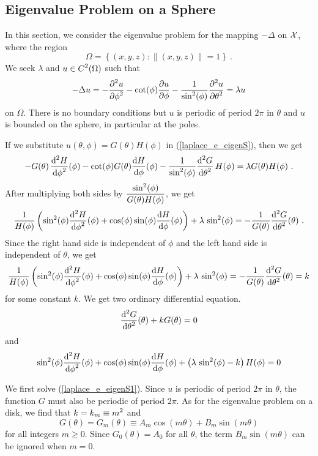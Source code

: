 \subsection{Eigenvalue Problem on a Sphere}

In this section, we consider the eigenvalue problem for the mapping
$-\Delta$ on $\cal X$, where the region
\[
  \Omega = \left\{ (x,y,z) :  \|(x,y,z)\| = 1 \right\} \ .
\]
We seek $\lambda$ and $\displaystyle u \in C^2(\Omega)$ such that
\begin{equation} \label{laplace_e_eigenS}
-\Delta u = -\frac{\displaystyle \partial^{2}{u}} {\displaystyle \partial \phi^{2}} - \cot(\phi)\frac{\partial{u}}{\partial \phi}
- \frac{1}{\sin^2(\phi)}\frac{\displaystyle \partial^{2}{u}} {\displaystyle \partial \theta^{2}} 
= \lambda u
\end{equation}
on $\Omega$.  There is no boundary conditions but $u$ is periodic of period
$2\pi$ in $\theta$ and $u$ is bounded on the sphere, in particular at
the poles.

If we substitute $u(\theta, \phi) = G(\theta)H(\phi)$ in
(\ref{laplace_e_eigenS}), then we get 
\begin{equation} \label{laplace_e_eigenSB}
-G(\theta)\,\frac{\displaystyle \mathrm{d}^{2}{H}} {\displaystyle \mathrm{d}{\phi}^{2}}(\phi) -\cot(\phi) G(\theta)\frac{\mathrm{d}H}{\mathrm{d}{\phi}}(\phi)
- \frac{1}{\sin^2(\phi)} \frac{\displaystyle \mathrm{d}^{2}{G}} {\displaystyle \mathrm{d}{\theta}^{2}}\,H(\phi)
= \lambda G(\theta)H(\phi) \ .
\end{equation}
After multiplying both sides by
$\displaystyle \frac{\sin^2(\phi)}{G(\theta)H(\phi)}$, we get
\[
\frac{1}{H(\phi)} \left(\sin^2(\phi) \frac{\displaystyle \mathrm{d}^{2}{H}} {\displaystyle \mathrm{d}{\phi}^{2}}(\phi)
+ \cos(\phi) \sin(\phi) \frac{\mathrm{d}H}{\mathrm{d}{\phi}}(\phi)\right) +
\lambda\,\sin^2(\phi) = - \frac{1}{G(\theta)} \frac{\displaystyle \mathrm{d}^{2}{G}} {\displaystyle \mathrm{d}{\theta}^{2}}(\theta) \ .
\]
Since the right hand side is independent of $\phi$ and the left hand
side is independent of $\theta$, we get
\[
\frac{1}{H(\phi)} \left(\sin^2(\phi) \frac{\displaystyle \mathrm{d}^{2}{H}} {\displaystyle \mathrm{d}{\phi}^{2}}(\phi)
+ \cos(\phi) \sin(\phi) \frac{\mathrm{d}H}{\mathrm{d}{\phi}}(\phi)\right) +
\lambda\,\sin^2(\phi) = - \frac{1}{G(\theta)} \frac{\displaystyle \mathrm{d}^{2}{G}} {\displaystyle \mathrm{d}{\theta}^{2}}(\theta)
= k
\]
for some constant $k$.  We get two ordinary differential equation.
\begin{equation} \label{laplace_e_eigenS1}
\frac{\displaystyle \mathrm{d}^{2}{G}} {\displaystyle \mathrm{d}{\theta}^{2}}(\theta) + k G(\theta) = 0
\end{equation}
and
\begin{equation} \label{laplace_e_eigenS2}
\sin^2(\phi) \frac{\displaystyle \mathrm{d}^{2}{H}} {\displaystyle \mathrm{d}{\phi}^{2}}(\phi)
+ \cos(\phi) \sin(\phi) \frac{\mathrm{d}H}{\mathrm{d}{\phi}}(\phi) +
\left( \lambda\,\sin^2(\phi) - k\right) H(\phi) = 0
\end{equation}

We first solve (\ref{laplace_e_eigenS1}).  Since $u$ is periodic of period
$2\pi$ in $\theta$, the function $G$ must also be periodic of period
$2\pi$.  As for the eigenvalue problem on a disk, we find that
$\displaystyle k = k_m \equiv m^2$ and
\[
G(\theta) = G_m(\theta) \equiv A_m\cos(m\theta) + B_m\sin(m\theta)
\]
for all integers $m \geq 0$.  Since $G_0(\theta) = A_0$ for all
$\theta$, the term $B_m\sin(m\theta)$ can be ignored when $m=0$.

